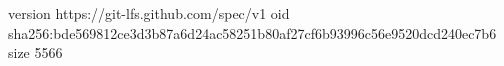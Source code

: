 version https://git-lfs.github.com/spec/v1
oid sha256:bde569812ce3d3b87a6d24ac58251b80af27cf6b93996c56e9520dcd240ec7b6
size 5566
